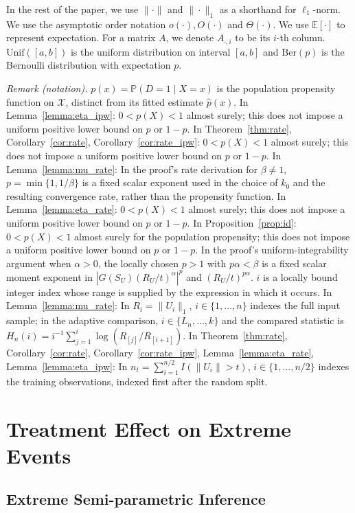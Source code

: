 \documentclass[12pt]{article}
\theoremstyle{plain}
\theoremstyle{definition}
\begin{document}
{} In the rest of the paper, we use $\| \cdot \|$ and $\| \cdot \|_1$ as a shorthand for $\ell_1$-norm. We use the asymptotic order notation $o (\cdot), O (\cdot)$ and $\Theta (\cdot)$. We use $\mathbb{E}[\cdot]$ to represent expectation. For a matrix $A$, we denote $A_{\cdot,i}$ to be its $i$-th column. $\text{Unif}([a,b])$ is the uniform distribution on interval $[a,b]$ and $\text{Ber}(p)$ is the Bernoulli distribution with expectation $p$.    

\noindent\textit{Remark (notation).} $p(x)=\mathbb P(D=1\mid X=x)$ is the population propensity function on $\mathcal X$, distinct from its fitted estimate $\hat p(x)$. In Lemma~\ref{lemma:eta_ipw}: $0<p(X)<1$ almost surely; this does not impose a uniform positive lower bound on $p$ or $1-p$. In Theorem~\ref{thm:rate}, Corollary~\ref{cor:rate}, Corollary~\ref{cor:rate_ipw}: $0<p(X)<1$ almost surely; this does not impose a uniform positive lower bound on $p$ or $1-p$. In Lemma~\ref{lemma:mu_rate}: In the proof's rate derivation for $\beta\ne1$, $p=\min\{1,1/\beta\}$ is a fixed scalar exponent used in the choice of $k_0$ and the resulting convergence rate, rather than the propensity function. In Lemma~\ref{lemma:eta_rate}: $0<p(X)<1$ almost surely; this does not impose a uniform positive lower bound on $p$ or $1-p$. In Proposition~\ref{prop:id}: $0<p(X)<1$ almost surely for the population propensity; this does not impose a uniform positive lower bound on $p$ or $1-p$. In the proof's uniform-integrability argument when $\alpha>0$, the locally chosen $p>1$ with $p\alpha<\beta$ is a fixed scalar moment exponent in $|G(S_U)(R_U/t)^\alpha|^p$ and $(R_U/t)^{p\alpha}$. $i$ is a locally bound integer index whose range is supplied by the expression in which it occurs. In Lemma~\ref{lemma:mu_rate}: In $R_i=\|U_i\|_1$, $i\in\{1,\ldots,n\}$ indexes the full input sample; in the adaptive comparison, $i\in\{L_n,\ldots,k\}$ and the compared statistic is $H_n(i)=i^{-1}\sum_{j=1}^{i}\log(R_{[j]}/R_{[i+1]})$. In Theorem~\ref{thm:rate}, Corollary~\ref{cor:rate}, Corollary~\ref{cor:rate_ipw}, Lemma~\ref{lemma:eta_rate}, Lemma~\ref{lemma:eta_ipw}: In $n_t=\sum_{i=1}^{n/2}I(\|U_i\|>t)$, $i\in\{1,\ldots,n/2\}$ indexes the training observations, indexed first after the random split.


\section{Treatment Effect on Extreme Events}\label{sec:main}
\subsection{Extreme Semi-parametric Inference}
\end{document}
